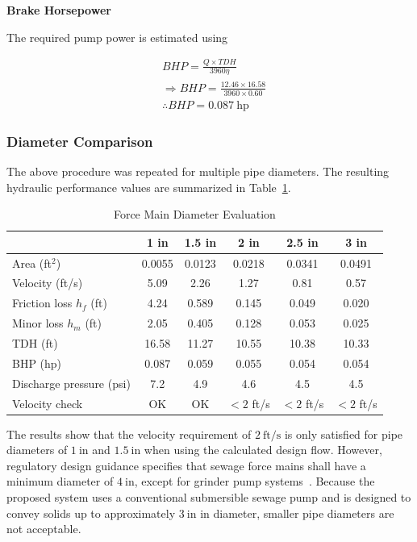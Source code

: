 \textbf{Brake Horsepower}

The required pump power is estimated using

\[
  \begin{aligned}
    & BHP = \frac{Q\times TDH}{3960\eta} \\
    &\Rightarrow BHP =
    \frac{12.46\times16.58}{3960\times0.60} \\
    &\therefore BHP = 0.087 \ \text{hp}
  \end{aligned}
\]

\subsubsection*{Diameter Comparison}

The above procedure was repeated for multiple pipe diameters.  
The resulting hydraulic performance values are summarized in Table~\ref{tab:diameter_comparison}.

\begin{table}[H]
\centering
\caption{Force Main Diameter Evaluation}
\label{tab:diameter_comparison}
\begin{tabular}{lccccc}
\toprule
 & \textbf{1 in} & \textbf{1.5 in} & \textbf{2 in} & \textbf{2.5 in} & \textbf{3 in} \\
\midrule
Area (ft$^2$) & 0.0055 & 0.0123 & 0.0218 & 0.0341 & 0.0491 \\
Velocity (ft/s) & 5.09 & 2.26 & 1.27 & 0.81 & 0.57 \\
Friction loss $h_f$ (ft) & 4.24 & 0.589 & 0.145 & 0.049 & 0.020 \\
Minor loss $h_m$ (ft) & 2.05 & 0.405 & 0.128 & 0.053 & 0.025 \\
TDH (ft) & 16.58 & 11.27 & 10.55 & 10.38 & 10.33 \\
BHP (hp) & 0.087 & 0.059 & 0.055 & 0.054 & 0.054 \\
Discharge pressure (psi) & 7.2 & 4.9 & 4.6 & 4.5 & 4.5 \\
Velocity check & OK & OK & $<2$ ft/s & $<2$ ft/s & $<2$ ft/s \\
\bottomrule
\end{tabular}
\end{table}

The results show that the velocity requirement of $2~\text{ft/s}$ is only satisfied for pipe diameters of $1~\text{in}$ and $1.5~\text{in}$ when using the calculated design flow. However, regulatory design guidance specifies that sewage force mains shall have a minimum diameter of $4~\text{in}$, except for grinder pump systems~\cite{MDEQ_DesignGuidance_2025}. Because the proposed system uses a conventional submersible sewage pump and is designed to convey solids up to approximately $3~\text{in}$ in diameter, smaller pipe diameters are not acceptable.

